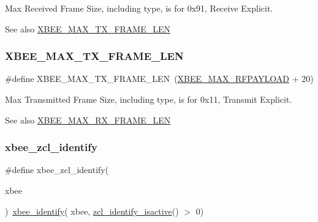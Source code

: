 Max Received Frame Size, including type, is for 0x91, Receive Explicit. 

\begin{DoxySeeAlso}{See also}
\hyperlink{group__xbee__device_gac074767d8df0749a2992bf5b292f9b54}{X\+B\+E\+E\+\_\+\+M\+A\+X\+\_\+\+T\+X\+\_\+\+F\+R\+A\+M\+E\+\_\+\+L\+EN} 
\end{DoxySeeAlso}
\mbox{\label{group__xbee__device_gac074767d8df0749a2992bf5b292f9b54}} 
\subsubsection{\texorpdfstring{X\+B\+E\+E\+\_\+\+M\+A\+X\+\_\+\+T\+X\+\_\+\+F\+R\+A\+M\+E\+\_\+\+L\+EN}{XBEE\_MAX\_TX\_FRAME\_LEN}}
{\footnotesize\ttfamily \#define X\+B\+E\+E\+\_\+\+M\+A\+X\+\_\+\+T\+X\+\_\+\+F\+R\+A\+M\+E\+\_\+\+L\+EN~(\hyperlink{group__xbee__device_gaea0dcde46961aae6f1cf5949be02d1a6}{X\+B\+E\+E\+\_\+\+M\+A\+X\+\_\+\+R\+F\+P\+A\+Y\+L\+O\+AD} + 20)}



Max Transmitted Frame Size, including type, is for 0x11, Transmit Explicit. 

\begin{DoxySeeAlso}{See also}
\hyperlink{group__xbee__device_gaefbbf0c7c5b7560f7137e5ff2cab4e45}{X\+B\+E\+E\+\_\+\+M\+A\+X\+\_\+\+R\+X\+\_\+\+F\+R\+A\+M\+E\+\_\+\+L\+EN} 
\end{DoxySeeAlso}
\mbox{\label{group__xbee__device_gaece12bbe1dd3135e51f714b485ed0cf2}} 
\subsubsection{\texorpdfstring{xbee\+\_\+zcl\+\_\+identify}{xbee\_zcl\_identify}}
{\footnotesize\ttfamily \#define xbee\+\_\+zcl\+\_\+identify(\begin{DoxyParamCaption}\item[{}]{xbee }\end{DoxyParamCaption})~\hyperlink{group__xbee__device_ga42768d8f8aa841ed4f42396cff2815aa}{xbee\+\_\+identify}( xbee, \hyperlink{group__zcl__identify_ga95b00d55b861c1ea6033c16794ae818d}{zcl\+\_\+identify\+\_\+isactive}() $>$ 0)}



